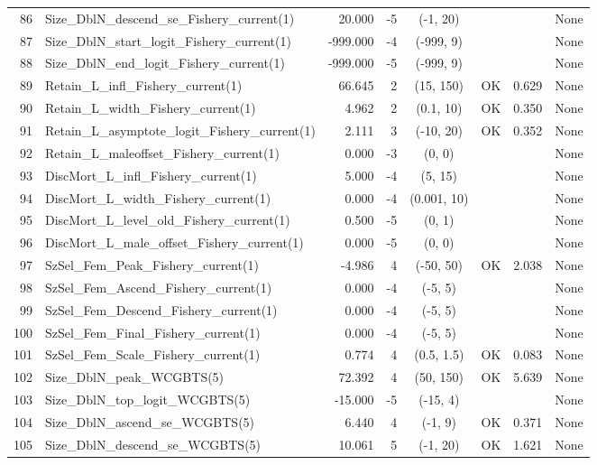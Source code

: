 \documentclass[12pt,]{article}
\begin{document}
\begin{landscape}
\begin{longtable}{rlrrcccl}
  86 & Size\_DblN\_descend\_se\_Fishery\_current(1) & 20.000 & -5 & (-1, 20) &  &  & None \\ 
  87 & Size\_DblN\_start\_logit\_Fishery\_current(1) & -999.000 & -4 & (-999, 9) &  &  & None \\ 
  88 & Size\_DblN\_end\_logit\_Fishery\_current(1) & -999.000 & -5 & (-999, 9) &  &  & None \\ 
  89 & Retain\_L\_infl\_Fishery\_current(1) & 66.645 & 2 & (15, 150) & OK & 0.629 & None \\ 
  90 & Retain\_L\_width\_Fishery\_current(1) & 4.962 & 2 & (0.1, 10) & OK & 0.350 & None \\ 
  91 & Retain\_L\_asymptote\_logit\_Fishery\_current(1) & 2.111 & 3 & (-10, 20) & OK & 0.352 & None \\ 
  92 & Retain\_L\_maleoffset\_Fishery\_current(1) & 0.000 & -3 & (0, 0) &  &  & None \\ 
  93 & DiscMort\_L\_infl\_Fishery\_current(1) & 5.000 & -4 & (5, 15) &  &  & None \\ 
  94 & DiscMort\_L\_width\_Fishery\_current(1) & 0.000 & -4 & (0.001, 10) &  &  & None \\ 
  95 & DiscMort\_L\_level\_old\_Fishery\_current(1) & 0.500 & -5 & (0, 1) &  &  & None \\ 
  96 & DiscMort\_L\_male\_offset\_Fishery\_current(1) & 0.000 & -5 & (0, 0) &  &  & None \\ 
  97 & SzSel\_Fem\_Peak\_Fishery\_current(1) & -4.986 & 4 & (-50, 50) & OK & 2.038 & None \\ 
  98 & SzSel\_Fem\_Ascend\_Fishery\_current(1) & 0.000 & -4 & (-5, 5) &  &  & None \\ 
  99 & SzSel\_Fem\_Descend\_Fishery\_current(1) & 0.000 & -4 & (-5, 5) &  &  & None \\ 
  100 & SzSel\_Fem\_Final\_Fishery\_current(1) & 0.000 & -4 & (-5, 5) &  &  & None \\ 
  101 & SzSel\_Fem\_Scale\_Fishery\_current(1) & 0.774 & 4 & (0.5, 1.5) & OK & 0.083 & None \\ 
  102 & Size\_DblN\_peak\_WCGBTS(5) & 72.392 & 4 & (50, 150) & OK & 5.639 & None \\ 
  103 & Size\_DblN\_top\_logit\_WCGBTS(5) & -15.000 & -5 & (-15, 4) &  &  & None \\ 
  104 & Size\_DblN\_ascend\_se\_WCGBTS(5) & 6.440 & 4 & (-1, 9) & OK & 0.371 & None \\ 
  105 & Size\_DblN\_descend\_se\_WCGBTS(5) & 10.061 & 5 & (-1, 20) & OK & 1.621 & None \\ 

\end{longtable}
\end{landscape}
\end{document}
